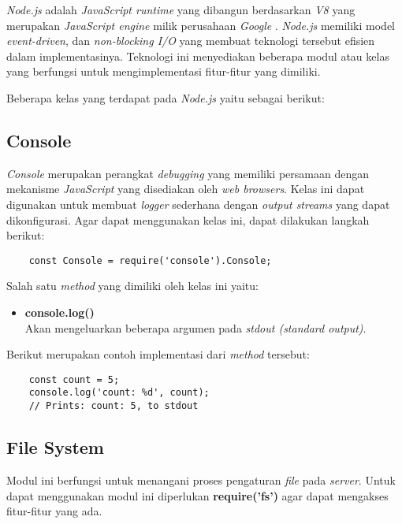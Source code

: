 \textit{Node.js} adalah \textit{JavaScript runtime} yang dibangun berdasarkan \textit{V8} yang merupakan \textit{JavaScript engine} milik perusahaan \textit{Google} \cite{nodejs}. \textit{Node.js} memiliki model \textit{event-driven}, dan \textit{non-blocking I/O} yang membuat teknologi tersebut efisien dalam implementasinya. Teknologi ini menyediakan beberapa modul atau kelas yang berfungsi untuk mengimplementasi fitur-fitur yang dimiliki.

Beberapa kelas yang terdapat pada \textit{Node.js} yaitu sebagai berikut: 

\subsection{Console}
\textit{Console} merupakan perangkat \textit{debugging} yang memiliki persamaan dengan mekanisme \textit{JavaScript} yang disediakan oleh \textit{web browsers}. Kelas ini dapat digunakan untuk membuat \textit{logger} sederhana dengan \textit{output streams} yang dapat dikonfigurasi. Agar dapat menggunakan kelas ini, dapat dilakukan langkah berikut: 

\begin{lstlisting}
	const Console = require('console').Console;
\end{lstlisting}

Salah satu \textit{method} yang dimiliki oleh kelas ini yaitu: 

\begin{itemize}
	\item \textbf{console.log()} \\ Akan mengeluarkan beberapa argumen pada \textit{stdout (standard output)}.
\end{itemize}

Berikut merupakan contoh implementasi dari \textit{method} tersebut:

\begin{lstlisting}
	const count = 5;
	console.log('count: %d', count);
	// Prints: count: 5, to stdout
\end{lstlisting}

\subsection{File System}
Modul ini berfungsi untuk menangani proses pengaturan \textit{file} pada \textit{server}. Untuk dapat menggunakan modul ini diperlukan \textbf{require('fs')} agar dapat mengakses fitur-fitur yang ada.


